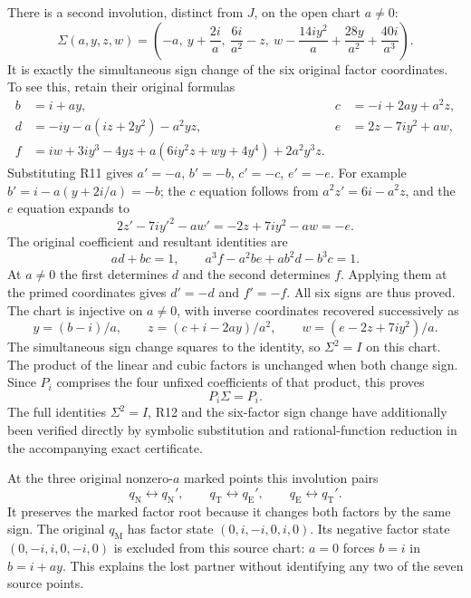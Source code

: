 \documentclass[11pt]{article}
\begin{document}
There is a second involution, distinct from $J$, on the open chart
$a\ne0$:
\begin{equation}
 \Sigma(a,y,z,w)=\left(-a,\ y+\frac{2i}{a},\
 \frac{6i}{a^2}-z,\
 w-\frac{14iy^2}{a}+\frac{28y}{a^2}+\frac{40i}{a^3}\right).
 \tag{R11}
\end{equation}
It is exactly the simultaneous sign change of the six original
factor coordinates. To see this, retain their original formulas
\begin{align*}
 b&=i+ay,&c&=-i+2ay+a^2z,\\
 d&=-iy-a(iz+2y^2)-a^2yz,&e&=2z-7iy^2+aw,\\
 f&=iw+3iy^3-4yz+a(6iy^2z+wy+4y^4)+2a^2y^3z.
\end{align*}
Substituting R11 gives $a'=-a$, $b'=-b$, $c'=-c$, $e'=-e$.
For example $b'=i-a(y+2i/a)=-b$; the $c$ equation follows
from $a^2z'=6i-a^2z$, and the $e$ equation expands to
\[
 2z'-7iy'^2-a w'=-2z+7iy^2-aw=-e.
\]
The original coefficient and resultant identities are
\[
 ad+bc=1,\qquad
 a^3f-a^2be+ab^2d-b^3c=1.
\]
At $a\ne0$ the first determines $d$ and the second determines
$f$. Applying them at the primed coordinates gives $d'=-d$ and
$f'=-f$. All six signs are thus proved. The chart is injective
on $a\ne0$, with inverse coordinates recovered successively as
\[
 y=(b-i)/a,\qquad z=(c+i-2ay)/a^2,\qquad
 w=(e-2z+7iy^2)/a.
\]
The simultaneous sign change squares to the identity, so
$\Sigma^2=I$ on this chart. The product of the linear and cubic
factors is unchanged when both change sign. Since $P_i$ comprises
the four unfixed coefficients of that product, this proves
\begin{equation}
 P_i\Sigma=P_i.\tag{R12}
\end{equation}
The full identities $\Sigma^2=I$, R12 and the six-factor sign
change have additionally been verified directly by symbolic
substitution and rational-function reduction in the accompanying
exact certificate.

At the three original nonzero-$a$ marked points this involution
pairs
\[
 q_{\mathrm N}\leftrightarrow q_{\mathrm N}',\qquad
 q_{\mathrm T}\leftrightarrow q_{\mathrm E}',\qquad
 q_{\mathrm E}\leftrightarrow q_{\mathrm T}'.
\]
It preserves the marked factor root because it changes both factors
by the same sign. The original $q_{\mathrm M}$ has factor state
$(0,i,-i,0,i,0)$. Its negative factor state
$(0,-i,i,0,-i,0)$ is excluded from this source chart: $a=0$
forces $b=i$ in $b=i+ay$. This explains the lost partner without
identifying any two of the seven source points.
\end{document}
